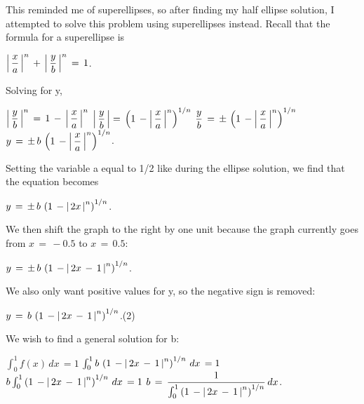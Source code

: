 \documentclass[letterpaper,12pt]{article}
\theoremstyle{definition}
\begin{document}
This reminded me of superellipses, so after finding my half ellipse solution, I attempted to solve this problem using superellipses instead.
\newline
Recall that the formula for a superellipse is

\begin{center}
    $\abs{\,\dfrac{x}{a}\,}^n\,+\,\abs{\,\dfrac{y}{b}\,}^n\,=\,1$.
\end{center}

Solving for y,

\begin{center}
    $\abs{\,\dfrac{y}{b}\,}^n\,=\,1\,-\,\abs{\,\dfrac{x}{a}\,}^n$
    \vskip 16pt
    $\abs{\,\dfrac{y}{b}\,}=\,\left(1\,-\abs{\,\dfrac{x}{a}\,}^n\right)^{1/n}$
    \vskip 16pt
    $\dfrac{y}{b}\,=\,\pm\,\left(1\,-\abs{\,\dfrac{x}{a}\,}^n\right)^{1/n}$
    \vskip 16pt
    $y\,=\,\pm\,b\,\left(1\,-\abs{\,\dfrac{x}{a}\,}^n\right)^{1/n}$.
\end{center}

\pagebreak

Setting the variable a equal to 1/2 like during the ellipse solution, we find that the equation becomes

\begin{center}
    $y\,=\,\pm\,b\,\left(1\,-\abs{\,2x\,}^n\right)^{1/n}$.
\end{center}

We then shift the graph to the right by one unit because the graph currently goes from $x\,=\,-0.5$ to $x\,=\,0.5$:

\begin{center}
    $y\,=\,\pm\,b\,\left(1\,-\abs{\,2x\,-\,1\,}^n\right)^{1/n}$.
\end{center}

We also only want positive values for y, so the negative sign is removed:

\begin{center}
    \hspace{4.6cm}$y\,=\,b\,\left(1\,-\abs{\,2x\,-\,1\,}^n\right)^{1/n}$.\hspace{4.6cm}(2)
\end{center}

We wish to find a general solution for b:

\begin{center}
    $\int_{0}^{1} f(x)\,dx\,=1$
    \vskip 16pt
    $\int_{0}^{1} b\,\left(1\,-\abs{\,2x\,-\,1\,}^n\right)^{1/n}\,dx\,=1$
    \vskip 16pt
    $b\int_{0}^{1}\left(1\,-\abs{\,2x\,-\,1\,}^n\right)^{1/n}\,dx\,=1$
    \vskip 16pt
    $b\,=\,\dfrac{1}{\int_{0}^{1}\left(1\,-\abs{\,2x\,-\,1\,}^n\right)^{1/n}}\,dx$.
\end{center}
\end{document}
